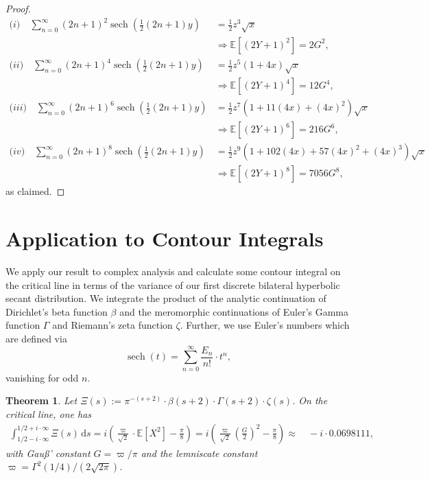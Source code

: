 \documentclass[12pt]{amsart}
\newtheorem{theorem}{Theorem}[section]
\theoremstyle{definition}
\theoremstyle{remark}
\numberwithin{equation}{section}
\newcommand{\1}{\mathbbm{1}}
\begin{document}
{\begin{proof}
\begin{align*}
\textit{(i)} \quad
\sum_{n=0}^\infty (2n+1)^{2} \operatorname{sech}\left(\frac{1}{2} (2n+1)y\right) &= \frac{1}{2} z^3 \sqrt{x}\\
& \Rightarrow \mathbb{E}\left[(2Y+1)^2 \right]= 2 G^2,\\
\textit{(ii)} \quad
\sum_{n=0}^\infty (2n+1)^{4} \operatorname{sech}\left(\frac{1}{2} (2n+1)y\right) &= \frac{1}{2} z^5 (1+4x) \sqrt{x}\\
& \Rightarrow \mathbb{E}\left[(2Y+1)^4 \right] = 12 G^4,\\
\textit{(iii)} \quad
\sum_{n=0}^\infty (2n+1)^{6} \operatorname{sech}\left(\frac{1}{2} (2n+1)y\right) &= \frac{1}{2} z^7 (1+11(4x) + (4x)^2) \sqrt{x}\\
& \Rightarrow \mathbb{E}\left[(2Y+1)^6 \right] = 216 G^6,\\
\textit{(iv)} \quad
\sum_{n=0}^\infty (2n+1)^{8} \operatorname{sech}\left(\frac{1}{2} (2n+1)y\right) &= \frac{1}{2} z^9 (1 + 102(4x) + 57(4x)^2 + (4x)^3) \sqrt{x}\\
& \Rightarrow \mathbb{E}\left[(2Y+1)^8 \right] = 7056 G^8,
\end{align*}
as claimed.
\end{proof}

\section{Application to Contour Integrals}

We apply our result to complex analysis and calculate some contour integral on the critical line in terms of the variance of our first discrete bilateral hyperbolic secant distribution. We integrate the product of the analytic continuation of Dirichlet's beta function $\beta$ and the meromorphic continuations of Euler's Gamma function $\Gamma$ and Riemann's zeta function $\zeta$. Further, we use Euler's numbers which are defined via
$$
\operatorname{sech}(t) = \sum_{n=0}^\infty \frac{E_n}{n!} \cdot t^n,$$
vanishing for odd $n$.

\begin{theorem}
Let $\Xi(s):= \pi^{-(s+2)} \cdot \beta(s+2) \cdot \Gamma(s+2) \cdot \zeta(s)$. On the critical line, one has
\begin{align*}
\int_{1/2-i\cdot \infty}^{1/2 + i \cdot \infty} \Xi(s)\, \mathrm{d}s = i \left( \frac{\varpi}{\sqrt{2}} \cdot \mathbb{E}\left[X^2 \right] - \frac{\pi}{8} \right) = i \left( \frac{\varpi}{\sqrt{2}} \left(\frac{G}{2}\right)^2 - \frac{\pi}{8} \right) \approx&\ -i \cdot 0.0698111,
\end{align*}
with Gau\ss' constant $G = \varpi/\pi$ and the lemniscate constant $\varpi = \Gamma^2(1/4)/(2\sqrt{2\pi})$.
\end{theorem}

}
\end{document}
